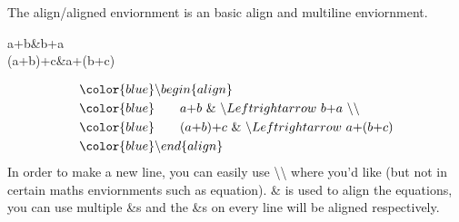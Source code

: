 \documentclass{beamer}
\begin{document}
\begin{frame}
	The {\color{blue}align/aligned} enviornment is an basic align and multiline enviornment.\\
	\begin{example}
		\begin{flalign}
			a+b&\Leftrightarrow b+a\\
			(a+b)+c&\Leftrightarrow a+(b+c)
		\end{flalign}
	\end{example}
	\begin{align*}
		&\color{blue} \backslash begin\{align\}\\
		&\color{blue} \quad\quad a\text{+}b\ \&\ \backslash Leftrightarrow\ b\text{+}a\ \backslash\backslash \\
		&\color{blue} \quad\quad (a\text{+}b)\text{+}c\ \&\ \backslash Leftrightarrow\ a\text{+}(b\text{+}c)\\
		&\color{blue} \backslash end\{align\}
	\end{align*}
	In order to make a new line, you can easily use {\color{blue}\textbackslash\textbackslash} where you'd like (but not in certain maths enviornments such as {\color{blue}equation}). {\color{blue}\&} is used to align the equations, you can use multiple {\color{blue}\&}s and the {\color{blue}\&}s on every line will be aligned respectively.
\end{frame}


\begin{frame}
	\frametitle{}
\end{frame}
\end{document}
